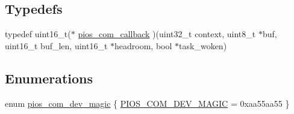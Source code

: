 \subsection*{\-Typedefs}
\begin{DoxyCompactItemize}
\item 
typedef uint16\-\_\-t($\ast$ \hyperlink{group___p_i_o_s___c_o_m_ga23f1888821f1f74a50c02adc459df597}{pios\-\_\-com\-\_\-callback} )(uint32\-\_\-t context, uint8\-\_\-t $\ast$buf, uint16\-\_\-t buf\-\_\-len, uint16\-\_\-t $\ast$headroom, bool $\ast$task\-\_\-woken)
\end{DoxyCompactItemize}
\subsection*{\-Enumerations}
\begin{DoxyCompactItemize}
\item 
enum \hyperlink{group___p_i_o_s___c_o_m_ga57d90f793d1e8323599fd11e929c945d}{pios\-\_\-com\-\_\-dev\-\_\-magic} \{ \hyperlink{group___p_i_o_s___c_o_m_gga57d90f793d1e8323599fd11e929c945dad53a3c0754f6da5d578fcd99184abc84}{\-P\-I\-O\-S\-\_\-\-C\-O\-M\-\_\-\-D\-E\-V\-\_\-\-M\-A\-G\-I\-C} =  0xaa55aa55
 \}
\end{DoxyCompactItemize}
